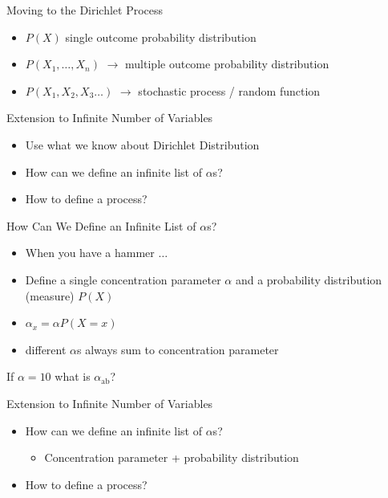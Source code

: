 \documentclass[11pt]{beamer}
\begin{document}
	\begin{frame}{Moving to the Dirichlet Process}
		
		\begin{itemize}
			\item $P(X)$ single outcome probability distribution
			\item $P(X_1,\dots,X_n)$ $\rightarrow$ multiple outcome probability distribution
			\item $P(X_1,X_2,X_3\dots)$ $\rightarrow$ stochastic process / random function
		\end{itemize}
	\end{frame}
	
	\begin{frame}{Extension to Infinite Number of Variables}
		\begin{itemize}
			\item Use what we know about Dirichlet Distribution
			\item How can we define an infinite list of $\alpha$s?
			\item How to define a process?
		\end{itemize}
	\end{frame}
	
	\begin{frame}{How Can We Define an Infinite List of $\alpha$s?}
		\centering
		
		\begin{itemize}
			\item When you have a hammer $\dots$
			\item Define a single concentration parameter $\alpha$ and a  probability distribution (measure) $P(X)$
			\item $\alpha_x = \alpha P(X = x)$
			\item different $\alpha$s always sum to concentration parameter
		\end{itemize}
		
		
		\vspace{10pt} If $\alpha = 10$ what is $\alpha_{\text{ab}}$?
	\end{frame}
	
	\begin{frame}{Extension to Infinite Number of Variables}
		\begin{itemize}
			\item How can we define an infinite list of $\alpha$s?
			\begin{itemize}
				\item Concentration parameter + probability distribution \checkmark
			\end{itemize}
			\item How to define a process?
		\end{itemize}
	\end{frame}
	
\end{document}
